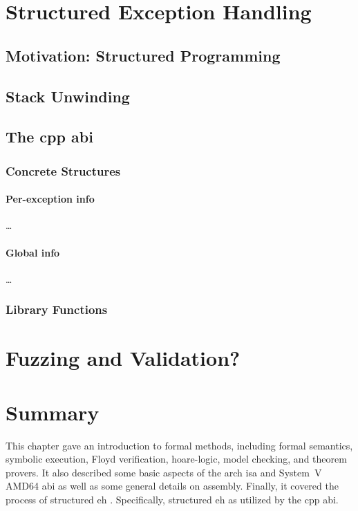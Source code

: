 \section{Structured Exception Handling}\label{se:structured_exceptions}

\subsection{Motivation: Structured Programming}

\subsection{Stack Unwinding}

\subsection{The \texorpdfstring\gls{cpp}{C++} \acs*{abi}}

\subsubsection{Concrete Structures}

\paragraph{Per-exception info}
\todo\dots
\paragraph{Global info}
\todo\dots

\subsubsection{Library Functions}

\section{Fuzzing and Validation?}

\section{Summary}
This chapter gave an introduction to formal methods, including formal semantics,
symbolic execution, Floyd verification, \gls{hoare-logic}, model checking, and theorem provers.
It also described some basic aspects of the \gls{arch} \ac{isa} and System~V
AMD64 \ac{abi}
as well as some general details on assembly.
Finally, it covered the process of structured \ac{eh}%
.
Specifically, structured \ac{eh} as utilized by the \gls{cpp} \ac{abi}.
